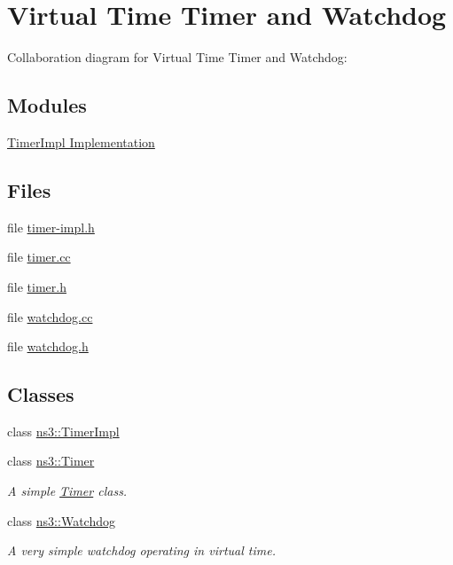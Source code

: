 \hypertarget{group__timer}{}\section{Virtual Time Timer and Watchdog}
\label{group__timer}
Collaboration diagram for Virtual Time Timer and Watchdog\+:
\subsection*{Modules}
\begin{DoxyCompactItemize}
\item 
\hyperlink{group__timerimpl}{Timer\+Impl Implementation}
\end{DoxyCompactItemize}
\subsection*{Files}
\begin{DoxyCompactItemize}
\item 
file \hyperlink{timer-impl_8h}{timer-\/impl.\+h}
\item 
file \hyperlink{timer_8cc}{timer.\+cc}
\item 
file \hyperlink{timer_8h}{timer.\+h}
\item 
file \hyperlink{watchdog_8cc}{watchdog.\+cc}
\item 
file \hyperlink{watchdog_8h}{watchdog.\+h}
\end{DoxyCompactItemize}
\subsection*{Classes}
\begin{DoxyCompactItemize}
\item 
class \hyperlink{classns3_1_1TimerImpl}{ns3\+::\+Timer\+Impl}
\item 
class \hyperlink{classns3_1_1Timer}{ns3\+::\+Timer}
\begin{DoxyCompactList}\small\item\em A simple \hyperlink{classns3_1_1Timer}{Timer} class. \end{DoxyCompactList}\item 
class \hyperlink{classns3_1_1Watchdog}{ns3\+::\+Watchdog}
\begin{DoxyCompactList}\small\item\em A very simple watchdog operating in virtual time. \end{DoxyCompactList}\end{DoxyCompactItemize}



